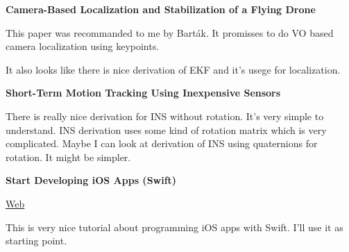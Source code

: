 \textbf{Camera-Based Localization and Stabilization of a Flying Drone}

\cite{skoda2015camera}

This paper was recommanded to me by Barták. It promisses to do VO based camera localization using keypoints.

It also looks like there is nice derivation of EKF and it's usege for localization.

\textbf{Short-Term Motion Tracking Using Inexpensive Sensors}

\cite{matzner2015short}

There is really nice derivation for INS without rotation. It's very simple to understand. INS derivation uses some kind of rotation matrix which is very complicated. Maybe I can look at derivation of INS using quaternions for rotation. It might be simpler.

\textbf{Start Developing iOS Apps (Swift)}

\href{https://developer.apple.com/library/ios/referencelibrary/GettingStarted/DevelopiOSAppsSwift/}{Web}

This is very nice tutorial about programming iOS apps with Swift. I'll use it as starting point.